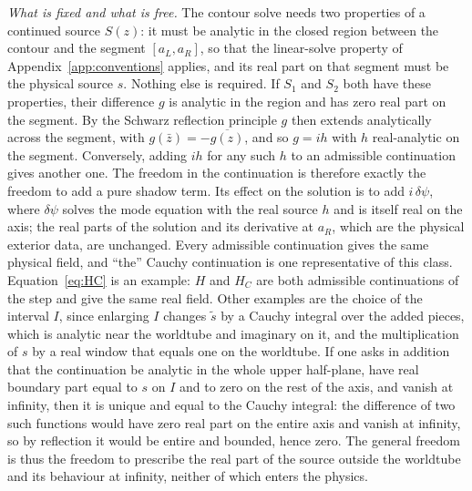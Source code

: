 \documentclass[aps,prd,twocolumn,superscriptaddress,nofootinbib,floatfix]{revtex4-2}
\begin{document}
\emph{What is fixed and what is free.}
The contour solve needs two properties of a continued source $S(z)$: it must be analytic in the closed region between the contour and the segment $[a_L,a_R]$, so that the linear-solve property of Appendix~\ref{app:conventions} applies, and its real part on that segment must be the physical source $s$.
Nothing else is required.
If $S_1$ and $S_2$ both have these properties, their difference $g$ is analytic in the region and has zero real part on the segment.
By the Schwarz reflection principle $g$ then extends analytically across the segment, with $g(\bar z)=-\overline{g(z)}$, and so $g=ih$ with $h$ real-analytic on the segment.
Conversely, adding $ih$ for any such $h$ to an admissible continuation gives another one.
The freedom in the continuation is therefore exactly the freedom to add a pure shadow term.
Its effect on the solution is to add $i\,\delta\psi$, where $\delta\psi$ solves the mode equation with the real source $h$ and is itself real on the axis; the real parts of the solution and its derivative at $a_R$, which are the physical exterior data, are unchanged.
Every admissible continuation gives the same physical field, and ``the'' Cauchy continuation is one representative of this class.
Equation~\eqref{eq:HC} is an example: $H$ and $H_C$ are both admissible continuations of the step and give the same real field.
Other examples are the choice of the interval $I$, since enlarging $I$ changes $\tilde s$ by a Cauchy integral over the added pieces, which is analytic near the worldtube and imaginary on it, and the multiplication of $s$ by a real window that equals one on the worldtube.
If one asks in addition that the continuation be analytic in the whole upper half-plane, have real boundary part equal to $s$ on $I$ and to zero on the rest of the axis, and vanish at infinity, then it is unique and equal to the Cauchy integral: the difference of two such functions would have zero real part on the entire axis and vanish at infinity, so by reflection it would be entire and bounded, hence zero.
The general freedom is thus the freedom to prescribe the real part of the source outside the worldtube and its behaviour at infinity, neither of which enters the physics.
\end{document}
